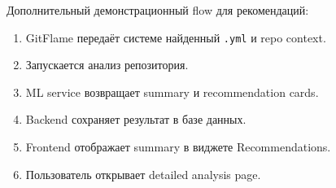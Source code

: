 \documentclass[12pt,a4paper]{article}
\begin{document}
Дополнительный демонстрационный flow для рекомендаций:

\begin{enumerate}
    \item GitFlame передаёт системе найденный \texttt{.yml} и repo context.
    \item Запускается анализ репозитория.
    \item ML service возвращает summary и recommendation cards.
    \item Backend сохраняет результат в базе данных.
    \item Frontend отображает summary в виджете Recommendations.
    \item Пользователь открывает detailed analysis page.
\end{enumerate}
\end{document}
